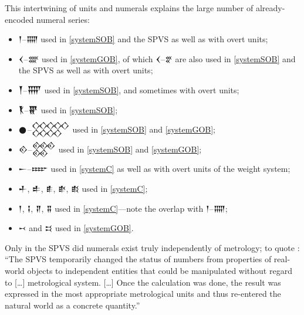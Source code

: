 \documentclass[10pt, a4paper, twoside]{article}
\begin{document}
This intertwining of units and numerals explains the large number of already-encoded numeral series:
\begin{itemize}[nosep]
\item {\xsuxfont 𒁹}–{\xsuxfont 𒐎} used in \ref{systemSOB} and the SPVS as well as with overt units;
\item {\xsuxfont 𒌋}–{\xsuxfont 𒐔} used in \ref{systemGOB}, of which {\xsuxfont 𒌋}–{\xsuxfont 𒐐} are also used in \ref{systemSOB} and the SPVS as well as with overt units;
\item {\xsuxfont 𒐕}–{\xsuxfont 𒐝} used in \ref{systemSOB}, and sometimes with overt units;
\item {\xsuxfont 𒐞}–{\xsuxfont 𒐢} used in \ref{systemSOB};
\item {\xsuxfont 𒊹}–{\xsuxfont 𒐫} used in \ref{systemSOB} and \ref{systemGOB};
\item {\xsuxfont 𒐬}–{\xsuxfont 𒐱} used in \ref{systemSOB} and \ref{systemGOB};
\item {\xsuxfont 𒀸}–{\xsuxfont 𒐇} used in \ref{systemC} as well as with overt units of the weight system;
\item {\xsuxfont 𒑏}, {\xsuxfont 𒑐}, {\xsuxfont 𒑑}, {\xsuxfont 𒑒}, {\xsuxfont 𒑔} used in \ref{systemC};
\item {\xsuxfont 𒁹}, {\xsuxfont 𒑖}, {\xsuxfont 𒑗}, {\xsuxfont 𒐉} used in \ref{systemC}—note the overlap with {\xsuxfont 𒁹}–{\xsuxfont 𒐎};
\item {\xsuxfont 𒑘} and 	{\xsuxfont 𒑙} used in \ref{systemGOB}.
\end{itemize}
Only in the SPVS did numerals exist truly independently of metrology; to quote \cite[78]{Robson2008}:
``The SPVS temporarily changed the status of numbers from properties of real-world objects to independent entities that could be manipulated without regard to […] metrological system. […] Once the calculation was done, the result was expressed in the most appropriate metrological units and thus re-entered the natural world as a concrete quantity.''
\end{document}
